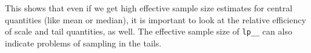 \documentclass[american,]{article}
\begin{document}
This shows that even if we get high effective sample size estimates for
central quantities (like mean or median), it is important to look at the
relative efficiency of scale and tail quantities, as well. The effective
sample size of \texttt{lp\_\_} can also indicate problems of sampling in
the tails.

\newpage

\hypertarget{refs}{}


\end{document}
